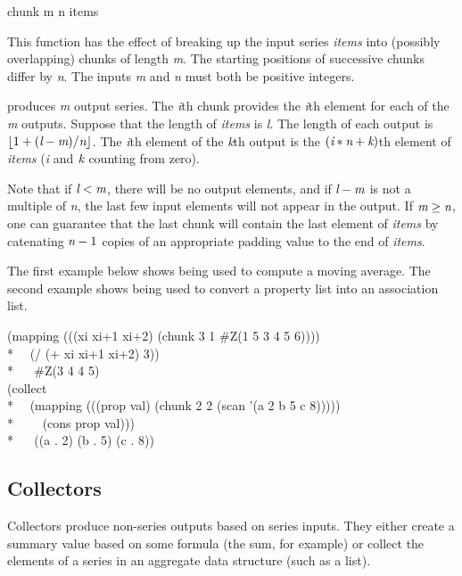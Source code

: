 \begin{defun}[Function]
chunk m n items

This function has the effect of breaking up the input series \emph{items} into
(possibly overlapping) chunks of length \emph{m}.  The starting positions of successive chunks differ
by \emph{n}.  The inputs \emph{m} and \emph{n} must both be positive integers.

 produces \emph{m} output series.  The \emph{i\/}th chunk provides
the \emph{i\/}th element for
each of  the \emph{m} outputs.  Suppose that the length of \emph{items} is \emph{l}.
The length of
each output is $\lfloor1+(\emph{l}-\emph{m})/\emph{n}\rfloor$.
The \emph{i\/}th element of the \emph{k\/}th output is the
$(\emph{i}*\emph{n}+\emph{k})$th element of \emph{items} (\emph{i} and $\emph{k}$ counting from zero).  

Note that if $\emph{l}<\emph{m}$, there will be no
output elements, and if $\emph{l}-\emph{m}$ is not a multiple of \emph{n},
the last few input elements will
not appear in the output.  If $\emph{m}\ge \emph{n}$,
one can guarantee that the last chunk will contain the last
element of \emph{items} by catenating $\emph{n}-1$
copies of an appropriate padding value to the end of \emph{items}.

The first example below shows 
being used to compute a moving average.  The second example shows
 being used to convert a property list into an association list.
\begin{lisp}
(mapping (((xi xi+1 xi+2) (chunk 3 1 \#Z(1 5 3 4 5 6)))) \\* 
~~(/ (+ xi xi+1 xi+2) 3)) \\*
~~{\EV} \#Z(3 4 4 5)
\\
(collect \\*
~~(mapping (((prop val) (chunk 2 2 (scan '(a 2 b 5 c 8))))) \\*
~~~~(cons prop val))) \\*
~~{\EV} ((a . 2) (b . 5) (c . 8))
\end{lisp}
\end{defun}

\subsection{Collectors}

Collectors produce non-series outputs based on series inputs.  They either
create a summary value based on some formula (the sum, for example) or collect the
elements of a series in an aggregate data structure (such as a list).

